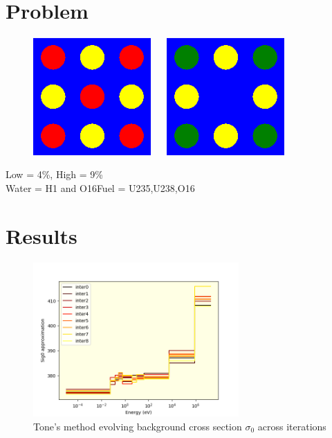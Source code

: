 \documentclass{beamer}
\begin{document}
\section{Problem}
\begin{frame}
\begin{figure}
\includegraphics[width=0.4\textwidth]{full_3x3}
  ~\quad~
\includegraphics[width=0.4\textwidth]{hole_3x3}
\end{figure}
Low = 4\%, High = 9\%\\
Water = H1 and O16\qquad Fuel = U235,U238,O16
\end{frame}




\section{Results}
\begin{frame}
\begin{figure}
\includegraphics[width=0.7\textwidth]{sig0Estimations}
  \caption{Tone's method evolving background cross section $\sigma_0$ across iterations}
\end{figure}
\end{frame}
\end{document}
